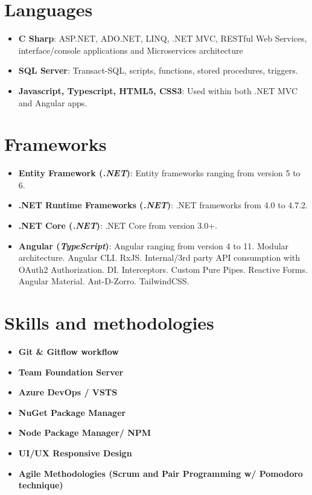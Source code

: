 \documentclass[letterpaper,11pt]{article}
\newcommand{\resumeItem}[2]{
  \item\small{
    \textbf{#1}{: #2 \vspace{-2pt}}
  }
}
\newcommand{\resumeItemItalic}[3]{
  \item\small{
    \textbf{#1 (\textit{#2})}{: #3 \vspace{-2pt}}
  }\vspace{-4pt}
}
\newcommand{\resumeItemAlign}[2]{
  \vspace{-1pt}\item\small{
    \textbf{#1} \hfill \textit{#2}
  }\vspace{-5pt}
}
\newcommand{\resumeSubHeadingListStart}{\begin{itemize}[leftmargin=*]}
\newcommand{\resumeSubHeadingListEnd}{\end{itemize}}
\begin{document}
\section{Languages}
\resumeSubHeadingListStart	
	\resumeItem{C Sharp} 
	{ASP.NET, ADO.NET, LINQ, .NET MVC, RESTful Web Services, interface/console applications and Microservices architecture}\\
	\resumeItem{SQL Server} 
	{Transact-SQL, scripts, functions, stored procedures, triggers.}\\
	\resumeItem{Javascript, Typescript, HTML5, CSS3}{Used within both .NET MVC and Angular apps.}
\resumeSubHeadingListEnd


\section{Frameworks}
\resumeSubHeadingListStart
  \resumeItemItalic{Entity Framework} {.NET}
    {Entity frameworks ranging from version 5 to 6.}
  \resumeItemItalic{.NET Runtime Frameworks}{.NET}
    {.NET frameworks from 4.0 to 4.7.2.}
\resumeItemItalic{.NET Core}{.NET}
    {.NET Core from version 3.0+.}
  \resumeItemItalic{Angular}{TypeScript}
    {Angular ranging from version 4 to 11. Modular architecture. Angular CLI. RxJS. Internal/3rd party API consumption with OAuth2 Authorization. DI. Interceptors. Custom Pure Pipes. Reactive Forms. Angular Material. Ant-D-Zorro. TailwindCSS.}
\resumeSubHeadingListEnd


\section{Skills and  methodologies}

\resumeSubHeadingListStart
	\resumeItemAlign{Git \& Gitflow workflow}{}
	\resumeItemAlign{Team Foundation Server}{}
	\resumeItemAlign{Azure DevOps / VSTS}{}
	\resumeItemAlign{NuGet Package Manager}{}
	\resumeItemAlign{Node Package Manager/ NPM}{}
	\resumeItemAlign{UI/UX Responsive Design}{}
	\resumeItemAlign{Agile Methodologies (Scrum and Pair Programming w/ Pomodoro technique) }{}
\resumeSubHeadingListEnd
\end{document}
